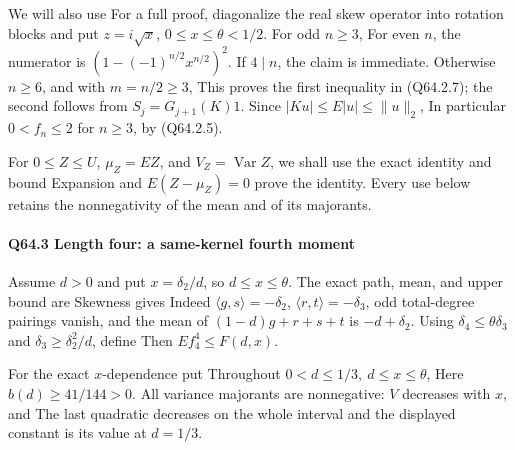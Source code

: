 We will also use
For a full proof, diagonalize the real skew operator into rotation
blocks and put \(z=i\sqrt{x}\), \(0\le x\le\theta<1/2\).
For odd \(n\ge3\),
For even \(n\), the numerator is
\((1-(-1)^{n/2}x^{n/2})^2\). If \(4\mid n\), the claim is immediate.
Otherwise \(n\ge6\), and with \(m=n/2\ge3\),
This proves the first inequality in (Q64.2.7); the second follows from
\(S_j=G_{j+1}(K)1\). Since \(|Ku|\le E|u|\le\|u\|_2\),
In particular \(0<f_n\le2\) for \(n\ge3\), by (Q64.2.5).

For \(0\le Z\le U\), \(\mu_Z=EZ\), and
\(V_Z=\operatorname{\operatorname{Var}}Z\), we shall use the exact identity and bound
Expansion and \(E(Z-\mu_Z)=0\) prove the identity. Every use below
retains the nonnegativity of the mean and of its majorants.

\paragraph{Q64.3 Length four: a same-kernel fourth moment}\label{part:Q64.3}

Assume \(d>0\) and put \(x=\delta_2/d\), so \(d\le x\le\theta\).
The exact path, mean, and upper bound are
Skewness gives
Indeed \(\langle g,\allowbreak  s\rangle=-\delta_2\),
\(\langle r,\allowbreak  t\rangle=-\delta_3\), odd total-degree pairings vanish, and
the mean of \((1-d)g+r+s+t\) is \(-d+\delta_2\).
Using \(\delta_4\le\theta \delta_3\) and \(\delta_3\ge \delta_2^2/d\), define
Then \(Ef_4^4\le F(d,\allowbreak  x)\).

For the exact \(x\)-dependence put
Throughout \(0<d\le1/3,\allowbreak  \ d\le x\le\theta\),
Here \(b(d)\ge41/144>0\). All variance majorants are nonnegative:
\(V\) decreases with \(x\), and
The last quadratic decreases on the whole interval and the displayed
constant is its value at \(d=1/3\).

